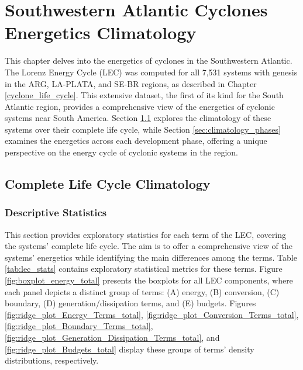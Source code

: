 \chapter{Southwestern Atlantic Cyclones Energetics Climatology} \label{ch:energetics}

This chapter delves into the energetics of cyclones in the Southwestern Atlantic. The Lorenz Energy Cycle (LEC) was computed for all 7,531 systems with genesis in the ARG, LA-PLATA, and SE-BR regions, as described in Chapter \ref{cyclone_life_cycle}. This extensive dataset, the first of its kind for the South Atlantic region, provides a comprehensive view of the energetics of cyclonic systems near South America. Section \ref{sec:climatology} explores the climatology of these systems over their complete life cycle, while Section \ref{sec:climatology_phases} examines the energetics across each development phase, offering a unique perspective on the energy cycle of cyclonic systems in the region.

\section{Complete Life Cycle Climatology}\label{sec:climatology}

\subsection{Descriptive Statistics} \label{sec:statistics_complete}

This section provides exploratory statistics for each term of the LEC, covering the systems' complete life cycle. The aim is to offer a comprehensive view of the systems' energetics while identifying the main differences among the terms. Table \ref{tab:lec_stats} contains exploratory statistical metrics for these terms. Figure \ref{fig:boxplot_energy_total} presents the boxplots for all LEC components, where each panel depicts a distinct group of terms: (A) energy, (B) conversion, (C) boundary, (D) generation/dissipation terms, and (E) budgets. Figures \ref{fig:ridge_plot_Energy_Terms_total}, \ref{fig:ridge_plot_Conversion_Terms_total}, \ref{fig:ridge_plot_Boundary_Terms_total}, \ref{fig:ridge_plot_Generation_Dissipation_Terms_total}, and \ref{fig:ridge_plot_Budgets_total} display these groups of terms' density distributions, respectively.

